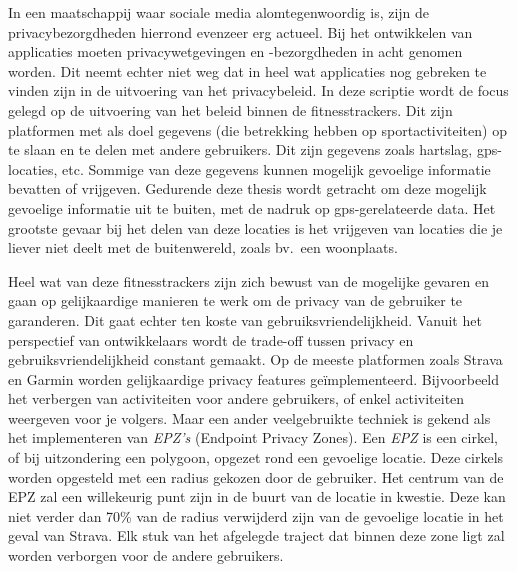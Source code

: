In een maatschappij waar sociale media alomtegenwoordig is, zijn de
privacybezorgdheden hierrond evenzeer erg actueel. Bij het ontwikkelen van
applicaties moeten privacywetgevingen en -bezorgdheden in acht genomen worden.
Dit neemt echter niet weg dat in heel wat applicaties nog gebreken te vinden
zijn in de uitvoering van het privacybeleid. In deze scriptie wordt de focus
gelegd op de uitvoering van het beleid binnen de fitnesstrackers. Dit zijn
platformen met als doel gegevens (die betrekking hebben op sportactiviteiten)
op te slaan en te delen met andere gebruikers. Dit zijn gegevens zoals
hartslag, gps-locaties, etc. Sommige van deze gegevens kunnen mogelijk
gevoelige informatie bevatten of vrijgeven. Gedurende deze thesis wordt
getracht om deze mogelijk gevoelige informatie uit te buiten, met de nadruk op
gps-gerelateerde data. Het grootste gevaar bij het delen van deze locaties is
het vrijgeven van locaties die je liever niet deelt met de buitenwereld, zoals
bv.\ een woonplaats.

Heel wat van deze fitnesstrackers zijn zich bewust van de mogelijke gevaren en
gaan op gelijkaardige manieren te werk om de privacy van de gebruiker te
garanderen. Dit gaat echter ten koste van gebruiksvriendelijkheid. Vanuit het
perspectief van ontwikkelaars wordt de trade-off tussen privacy en
gebruiksvriendelijkheid constant gemaakt. Op de meeste platformen zoals Strava
en Garmin worden gelijkaardige privacy features geïmplementeerd. Bijvoorbeeld
het verbergen van activiteiten voor andere gebruikers, of enkel activiteiten
weergeven voor je volgers. Maar een ander veelgebruikte techniek is gekend als
het implementeren van \textit{EPZ's} (Endpoint Privacy Zones). Een \textit{EPZ}
is een cirkel, of bij uitzondering een polygoon, opgezet rond een gevoelige
locatie. Deze cirkels worden opgesteld met een radius gekozen door de
gebruiker. Het centrum van de EPZ zal een willekeurig punt zijn in de buurt van
de locatie in kwestie. Deze kan niet verder dan 70\% van de radius verwijderd
zijn van de gevoelige locatie in het geval van Strava. Elk stuk van het
afgelegde traject dat binnen deze zone ligt zal worden verborgen voor de andere
gebruikers.

